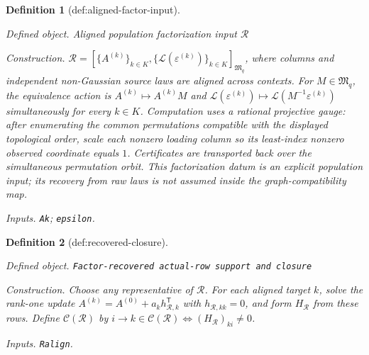 \documentclass{article}
\newtheorem{definition}{Definition}
\begin{document}
\begin{definition}[def:aligned-factor-input]\label{def:aligned-factor-input}
\par\smallskip\noindent\emph{Defined object.} Aligned population factorization input \(\mathcal R\)
\par\smallskip\noindent\emph{Construction.} \(\mathcal R=[\{A^{(k)}\}_{k\in K},\{\mathcal L(\varepsilon^{(k)})\}_{k\in K}]_{\mathfrak M_q}\), where columns and independent non-Gaussian source laws are aligned across contexts. For \(M\in\mathfrak M_q\), the equivalence action is \(A^{(k)}\mapsto A^{(k)}M\) and \(\mathcal L(\varepsilon^{(k)})\mapsto\mathcal L(M^{-1}\varepsilon^{(k)})\) simultaneously for every \(k\in K\). Computation uses a rational projective gauge: after enumerating the common permutations compatible with the displayed topological order, scale each nonzero loading column so its least-index nonzero observed coordinate equals \(1\). Certificates are transported back over the simultaneous permutation orbit. This factorization datum is an explicit population input; its recovery from raw laws is not assumed inside the graph-compatibility map.
\par\smallskip\noindent\emph{Inputs.} \texttt{Ak}; \texttt{epsilon}.
\end{definition}

\begin{definition}[def:recovered-closure]\label{def:recovered-closure}
\par\smallskip\noindent\emph{Defined object.} \texttt{Factor-\allowbreak{}recovered actual-\allowbreak{}row support and closure}
\par\smallskip\noindent\emph{Construction.} Choose any representative of \(\mathcal R\). For each aligned target \(k\), solve the rank-one update \(A^{(k)}=A^{(0)}+a_kh_{\mathcal R,k}^{\mathsf T}\) with \(h_{\mathcal R,kk}=0\), and form \(H_{\mathcal R}\) from these rows. Define \(\mathcal C(\mathcal R)\) by \(i\to k\in\mathcal C(\mathcal R)\Longleftrightarrow(H_{\mathcal R})_{ki}\ne0\).
\par\smallskip\noindent\emph{Inputs.} \texttt{Ralign}.
\end{definition}
\end{document}
